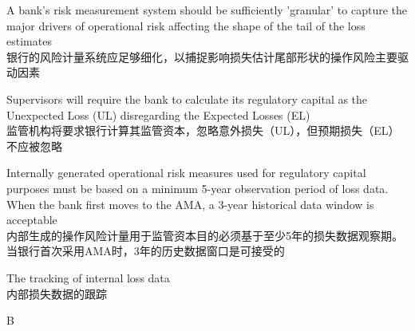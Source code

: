 \documentclass{article}
\begin{document}
\begin{choices}
    \item A bank's risk measurement system should be sufficiently 'granular' to capture the major drivers of operational risk affecting the shape of the tail of the loss estimates\\
    银行的风险计量系统应足够细化，以捕捉影响损失估计尾部形状的操作风险主要驱动因素
    \item Supervisors will require the bank to calculate its regulatory capital as the Unexpected Loss (UL) disregarding the Expected Losses (EL)\\
    监管机构将要求银行计算其监管资本，忽略意外损失（UL），但预期损失（EL）不应被忽略
    \item Internally generated operational risk measures used for regulatory capital purposes must be based on a minimum 5-year observation period of loss data. When the bank first moves to the AMA, a 3-year historical data window is acceptable\\
    内部生成的操作风险计量用于监管资本目的必须基于至少5年的损失数据观察期。当银行首次采用AMA时，3年的历史数据窗口是可接受的
    \item The tracking of internal loss data\\
    内部损失数据的跟踪
\end{choices}

\begin{correctanswer}
    B
\end{correctanswer}
\end{document}
